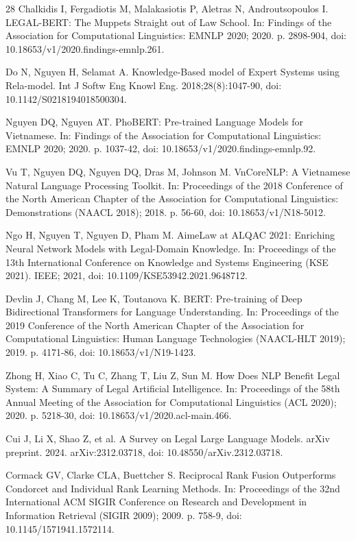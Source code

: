 \documentclass{IOS-Book-Article}
\begin{document}
\begin{thebibliography}{28}
Chalkidis I, Fergadiotis M, Malakasiotis P, Aletras N, Androutsopoulos I. LEGAL-BERT: The Muppets Straight out of Law School. In: Findings of the Association for Computational Linguistics: EMNLP 2020; 2020. p. 2898-904, doi: 10.18653/v1/2020.findings-emnlp.261.

Do N, Nguyen H, Selamat A. Knowledge-Based model of Expert Systems using Rela-model. Int J Softw Eng Knowl Eng. 2018;28(8):1047-90, doi: 10.1142/S0218194018500304.

Nguyen DQ, Nguyen AT. PhoBERT: Pre-trained Language Models for Vietnamese. In: Findings of the Association for Computational Linguistics: EMNLP 2020; 2020. p. 1037-42, doi: 10.18653/v1/2020.findings-emnlp.92.

Vu T, Nguyen DQ, Nguyen DQ, Dras M, Johnson M. VnCoreNLP: A Vietnamese Natural Language Processing Toolkit. In: Proceedings of the 2018 Conference of the North American Chapter of the Association for Computational Linguistics: Demonstrations (NAACL 2018); 2018. p. 56-60, doi: 10.18653/v1/N18-5012.

Ngo H, Nguyen T, Nguyen D, Pham M. AimeLaw at ALQAC 2021: Enriching Neural Network Models with Legal-Domain Knowledge. In: Proceedings of the 13th International Conference on Knowledge and Systems Engineering (KSE 2021). IEEE; 2021, doi: 10.1109/KSE53942.2021.9648712.

Devlin J, Chang M, Lee K, Toutanova K. BERT: Pre-training of Deep Bidirectional Transformers for Language Understanding. In: Proceedings of the 2019 Conference of the North American Chapter of the Association for Computational Linguistics: Human Language Technologies (NAACL-HLT 2019); 2019. p. 4171-86, doi: 10.18653/v1/N19-1423.

Zhong H, Xiao C, Tu C, Zhang T, Liu Z, Sun M. How Does NLP Benefit Legal System: A Summary of Legal Artificial Intelligence. In: Proceedings of the 58th Annual Meeting of the Association for Computational Linguistics (ACL 2020); 2020. p. 5218-30, doi: 10.18653/v1/2020.acl-main.466.

Cui J, Li X, Shao Z, et al. A Survey on Legal Large Language Models. arXiv preprint. 2024. arXiv:2312.03718, doi: 10.48550/arXiv.2312.03718.

Cormack GV, Clarke CLA, Buettcher S. Reciprocal Rank Fusion Outperforms Condorcet and Individual Rank Learning Methods. In: Proceedings of the 32nd International ACM SIGIR Conference on Research and Development in Information Retrieval (SIGIR 2009); 2009. p. 758-9, doi: 10.1145/1571941.1572114.

\end{thebibliography}
\end{document}
